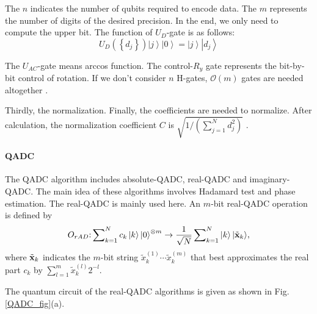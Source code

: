 \documentclass[%
 reprint,
 amsmath,amssymb,
pra,
]{revtex4-1}
\begin{document}
The $n$ indicates the number of qubits required to encode data. The $m$ represents the number of digits of the desired precision. In the end, we only need to compute the upper bit. The function of ${U_D}$-gate is as follows:
\[{U_D}\left( {\left\{ {{d_j}} \right\}} \right)\left| j \right\rangle \left| 0 \right\rangle  = \left| j \right\rangle \left| {{d_j}} \right\rangle \]

The ${U_{AC}}$-gate means arccos function. The control-${R_y}$ gate represents the bit-by-bit control of rotation. If we don't consider $n$ H-gates, $\mathcal{O}(m)$ gates are needed altogether \cite{mitarai2019quantum}.

Thirdly, the normalization. Finally, the coefficients are needed to normalize. After calculation, the normalization coefficient $C$ is $\sqrt {1/\left( {\sum\nolimits_{j = 1}^N {d_j^2} } \right)} $ \cite{mitarai2019quantum}.


\paragraph{QADC}

The QADC algorithm includes absolute-QADC, real-QADC and imaginary-QADC.
The main idea of these algorithms involves Hadamard test and phase estimation. The real-QADC is mainly used here. An $m$-bit real-QADC operation is defined by 
\begin{equation}
{O_{rAD}}{\rm{:}}\sum\nolimits_{k = 1}^N {{c_k}\left| k \right\rangle {{\left| 0 \right\rangle }^{ \otimes m}}}  \to \frac{1}{{\sqrt N }}\sum\nolimits_{k = 1}^N {\left| k \right\rangle \left| {{{\tilde{\textbf x} }_k}} \right\rangle } ,
\end{equation}
where ${\tilde {\textbf x}_k}$ indicates the $m$-bit string $\tilde x_k^{\left( 1 \right)} \cdots \tilde x_k^{\left( m \right)}$ that best approximates the real part ${c_k}$ by $\sum\nolimits_{l = 1}^m {\tilde x_k^{\left( l \right)}{2^{ - l}}} $.

The quantum circuit of the real-QADC algorithms is given as shown in Fig.\ref{QADC_fig}(a).
\end{document}
